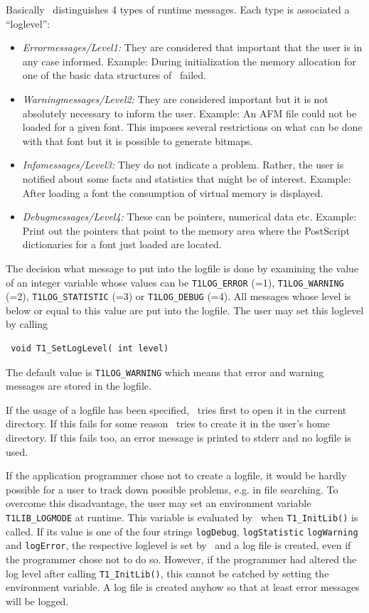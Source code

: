 Basically \tonelib\ distinguishes 4 types of runtime messages. Each type is
associated a ``loglevel'':
\begin{itemize}
\item {\sl Errormessages/Level1:}\/ They are considered that important that the user is
  in any case informed. Example: During initialization the memory allocation for
  one of the basic data structures of \tonelib\ failed.
\item {\sl Warningmessages/Level2:}\/ They are considered important but it is not
  absolutely necessary to inform the user. Example: An AFM file could not be
  loaded for a given font. This imposes several restrictions on what can be
  done with that font but it is possible to generate bitmaps.
\item {\sl Infomessages/Level3:}\/ They do not indicate a problem. Rather, the user
  is notified about some facts and statistics that might be of
  interest. Example: After loading a font the consumption of virtual memory is
  displayed. 
\item {\sl Debugmessages/Level4:}\/ These can be pointers, numerical data
  etc. Example: Print out the pointers that point to the memory area where the
  PostScript dictionaries for a font just loaded are located.
\end{itemize}
The decision what message to put into the logfile is done by examining the
value of an integer variable whose values can be \verb+T1LOG_ERROR+ (=1),
\verb+T1LOG_WARNING+ (=2), \verb+T1LOG_STATISTIC+ (=3) or \verb+T1LOG_DEBUG+
(=4). All messages whose level is below or equal to this value are put into the
logfile. The user may set this loglevel by calling
\precorr
\begin{verbatim}
 void T1_SetLogLevel( int level)
\end{verbatim}\postcorr
The default value is \verb+T1LOG_WARNING+ which means that error and warning
messages are stored in the logfile. 

If the usage of a logfile has been specified, \tonelib\ tries first to open
it in the current directory. If this fails for some reason \tonelib\ tries
to create it in the user's home directory. If this fails too, an error message
is printed to stderr and no logfile is used.

If the application programmer chose not to create a logfile, it would be hardly
possible for a user to track down possible problems, e.g. in file
searching. To overcome this disadvantage, the user may set an environment
variable \verb+T1LIB_LOGMODE+ at runtime. This variable is evaluated by
\tonelib\ when \verb+T1_InitLib()+ is called. If its value is one of the
four strings \verb+logDebug+, \verb+logStatistic+ \verb+logWarning+ and
\verb+logError+, the respective loglevel is set by \tonelib\ and a log file is
created, even if the programmer chose not to do so. However, if the programmer
had altered the log level after calling \verb+T1_InitLib()+, this cannot be
catched by setting the environment variable. A log file is created anyhow so
that at least error messages will be logged.

